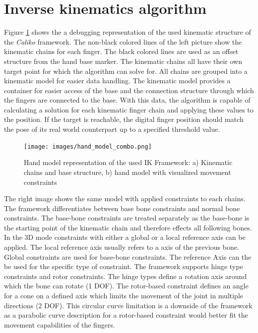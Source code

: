 \section{Inverse kinematics algorithm}
Figure \ref{img:hand-constraint_debug_view} shows the a debugging representation of the used kinematic structure of the \textit{Caliko} framework. The non-black colored lines of the left picture show the kinematic chains for each finger. The black colored lines are used as an offset structure from the hand base marker.
The kinematic chains all have their own target point for which the algorithm can solve for. All chains are grouped into a kinematic model for easier data handling. The kinematic model provides a container for easier access of the base and the connection structure through which the fingers are connected to the base.
With this data, the algorithm is capable of calculating a solution for each kinematic finger chain and applying these values to the position. If the target is reachable, the digital finger position should match the pose of its real world counterpart up to a specified threshold value.
\begin{figure}[H]
\centering
\texttt{[image: images/hand\_model\_combo.png]}
\caption{Hand model representation of the used IK Framework: a) Kinematic chains and base structure, b) hand model with visualized movement constraints}
\label{img:hand-constraint_debug_view} 
\end{figure}
The right image shows the same model with applied constraints to each chains. The framework differentiates between base bone constraints and normal bone constraints. The base-bone constraints are treated separately as the base-bone is the starting point of the kinematic chain and therefore effects all following bones. In the 3D mode constraints with either a global or a local reference axis can be applied. The local reference axis usually refers to a axis of the previous bone. Global constraints are used for base-bone constraints. The reference Axis can the be used for the specific type of constraint. The framework supports hinge type constraints and rotor constraints. The hinge types define a rotation axis around which the bone can rotate (1 DOF). The rotor-based constraint defines an angle for a cone on a defined axis which limits the movement of the joint in multiple directions (2 DOF). This circular curve limitation  is a downside of the framework as a parabolic curve description for a rotor-based constraint would better fit the movement capabilities of the fingers.
